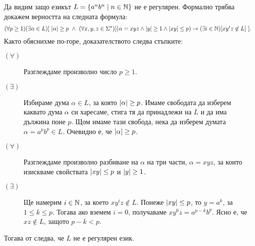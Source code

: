 \begin{example}\label{ex:regular:pumping:an-bn}
  Да видим защо езикът $L = \{a^nb^n \mid n\in \mathbb{N}\}$ не е регулярен.
  Формално трябва докажем верността на следната формула:
  {\small
    \[(\forall p \geq 1)(\exists \alpha \in L)[\ \abs{\alpha} \geq p\ \land\ (\forall x,y,z\in\Sigma^\star)[(\alpha = xyz \land \abs{y} \geq 1 \land \abs{xy} \leq p) \to (\exists i\in\Nat)[xy^iz \not\in L]\ ].\]}
  Както обяснихме по-горе, доказателството следва стъпките:
  \begin{description}
  \item[$(\forall)$]
    Разглеждаме произволно число $p \geq 1$.
  \item[$(\exists)$]
    Избираме дума $\alpha \in L$, за която $\lvert{\alpha}\rvert \geq p$. Имаме свободата да изберем каквато дума $\alpha$
    си харесаме, стига тя да принадлежи на $L$ и да има дължина поне $p$.
    Щом имаме тази свобода, нека да изберем думата $\alpha = a^pb^p \in L$.
    Очевидно е, че $\lvert{\alpha}\rvert \geq p$.
  \item[$(\forall)$]
    Разглеждаме произволно разбиване на $\alpha$ на три части, $\alpha = xyz$,
    за които изискваме свойствата $\lvert{xy}\rvert \leq p$ и $\lvert{y}\rvert \geq 1$.
  \item[$(\exists)$]
    Ще намерим $i\in\mathbb{N}$, за което $xy^iz \not\in L$.
    Понеже $\lvert{xy}\rvert \leq p$, то $y = a^k$, за  $1\leq k \leq p$.
    Тогава ако вземем $i = 0$, получаваме $xy^0z = a^{p-k}b^p$.
    Ясно е, че $xz \not\in L$, защото $p-k < p$.
  \end{description}  
  Тогава от  следва, че $L$ не е регулярен език.
\end{example}

